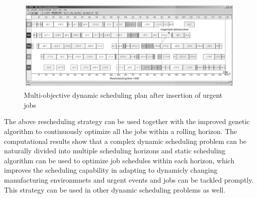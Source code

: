 \begin{figure}[h!]
	\begin{center}
		\includegraphics[width=1\linewidth]{sections/figure4.jpg}
		\caption{Multi-objective dynamic scheduling plan after insertion of urgent jobs}
		\label{fig:fig4}
	\end{center}
\end{figure}

The above rescheduling strategy can be used together with the improved genetic algorithm to continuously optimize all the jobs within a rolling horizon.
The computational results show that a complex dynamic scheduling problem can be naturally divided into multiple scheduling horizons and static scheduling algorithm can be used to optimize job schedules within each horizon, which improves the scheduling capability in adapting to dynamicly changing manufacturing environmnets and urgent events and jobs can be tackled promptly.
This strategy can be used in other dynamic scheduling problems as well.
